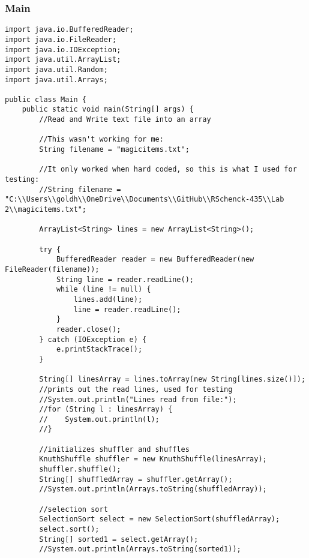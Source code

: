 \documentclass[10pt]{article}
\begin{document}
\subsubsection{Main}
\lstset{numbers=left, numberstyle=\tiny, stepnumber=1, numbersep=5pt, basicstyle=\footnotesize\ttfamily}
\begin{lstlisting}[frame=single, ]  
import java.io.BufferedReader;
import java.io.FileReader;
import java.io.IOException;
import java.util.ArrayList;
import java.util.Random;
import java.util.Arrays;

public class Main {
    public static void main(String[] args) {
        //Read and Write text file into an array

        //This wasn't working for me: 
        String filename = "magicitems.txt";

        //It only worked when hard coded, so this is what I used for testing:
        //String filename = "C:\\Users\\goldh\\OneDrive\\Documents\\GitHub\\RSchenck-435\\Lab 2\\magicitems.txt";

        ArrayList<String> lines = new ArrayList<String>();

        try {
            BufferedReader reader = new BufferedReader(new FileReader(filename));
            String line = reader.readLine();
            while (line != null) {
                lines.add(line);
                line = reader.readLine();
            }
            reader.close();
        } catch (IOException e) {
            e.printStackTrace();
        }

        String[] linesArray = lines.toArray(new String[lines.size()]);
        //prints out the read lines, used for testing
        //System.out.println("Lines read from file:");
        //for (String l : linesArray) {
        //    System.out.println(l);
        //}

        //initializes shuffler and shuffles
        KnuthShuffle shuffler = new KnuthShuffle(linesArray);
        shuffler.shuffle();
        String[] shuffledArray = shuffler.getArray();
        //System.out.println(Arrays.toString(shuffledArray));

        //selection sort
        SelectionSort select = new SelectionSort(shuffledArray);
        select.sort();
        String[] sorted1 = select.getArray();
        //System.out.println(Arrays.toString(sorted1));


\end{lstlisting}
\end{document}
